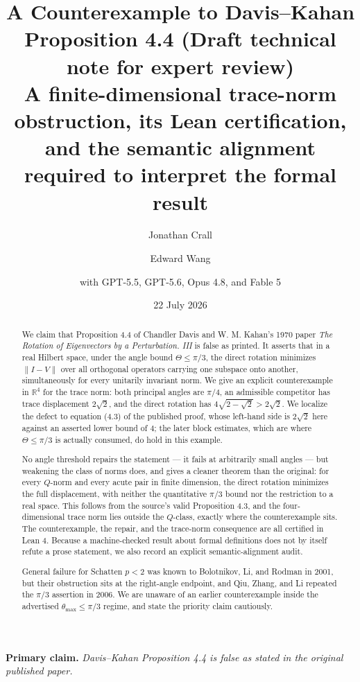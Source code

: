 \documentclass[11pt]{article}
\title{\textbf{A Counterexample to Davis--Kahan Proposition 4.4 (Draft technical note for expert review)}\\[0.45em]
\large A finite-dimensional trace-norm obstruction, its Lean certification,\\
and the semantic alignment required to interpret the formal result}
\author{Jonathan Crall \and Edward Wang \and 
\normalsize with GPT-5.5, GPT-5.6, Opus 4.8, and Fable 5}
\date{22 July 2026}
\theoremstyle{definition}
\newcommand{\R}{\mathbb R}
\begin{document}
\maketitle

\begin{abstract}
We claim that Proposition 4.4 of Chandler Davis and W. M. Kahan's 1970 paper
\emph{The Rotation of Eigenvectors by a Perturbation. III} is false as printed.
It asserts that in a real Hilbert space, under the angle bound
$\Theta\leq\pi/3$, the direct rotation minimizes $\lVert I-V\rVert$ over all
orthogonal operators carrying one subspace onto another, simultaneously for
every unitarily invariant norm.  We give an explicit counterexample in $\R^4$
for the trace norm: both principal angles are $\pi/4$, an admissible competitor
has trace displacement $2\sqrt2$, and the direct rotation has
$4\sqrt{2-\sqrt2}>2\sqrt2$.  We localize the defect to equation (4.3) of the
published proof, whose left-hand side is $2\sqrt2$ here against an asserted
lower bound of $4$; the later block estimates, which are where
$\Theta\leq\pi/3$ is actually consumed, do hold in this example.

No angle threshold repairs the statement — it fails at arbitrarily small angles
— but weakening the class of norms does, and gives a cleaner theorem than the
original: for every $Q$-norm and every acute pair in finite dimension, the
direct rotation minimizes the full displacement, with neither the quantitative
$\pi/3$ bound nor the restriction to a real space.  This follows from the source's valid Proposition 4.3, and the
four-dimensional trace norm lies outside the $Q$-class, exactly where the counterexample sits.
The counterexample, the repair, and the trace-norm consequence are all certified
in Lean 4.  Because a machine-checked result about formal definitions does not
by itself refute a prose statement, we also record an explicit
semantic-alignment audit.

General failure for Schatten $p<2$ was known to Bolotnikov, Li, and Rodman in
2001, but their obstruction sits at the right-angle endpoint, and Qiu, Zhang,
and Li repeated the $\pi/3$ assertion in 2006.  We are unaware of an earlier
counterexample inside the advertised $\theta_{\max}\leq\pi/3$ regime, and state
the priority claim cautiously.
\end{abstract}

\begin{claimbox}
\textbf{Primary claim.}
\emph{Davis--Kahan Proposition 4.4 is false as stated in the original published
paper.}
\end{claimbox}
\end{document}

